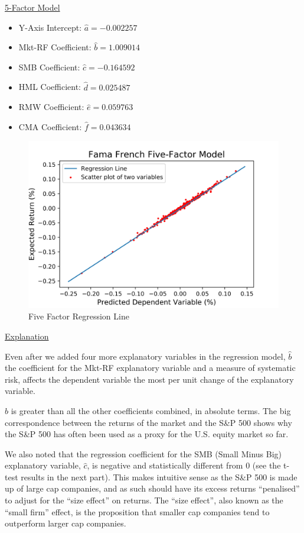\documentclass[a4paper]{article}
\begin{document}
\underline{5-Factor Model}
\begin{itemize}[nosep]
	\item Y-Axis Intercept: $\hat{a} = -0.002257$
	\item Mkt-RF Coefficient: $\hat{b} = 1.009014$
	\item SMB Coefficient: $\hat{c} = -0.164592$
	\item HML Coefficient: $\hat{d} = 0.025487$
	\item RMW Coefficient: $\hat{e} = 0.059763$
	\item CMA Coefficient: $\hat{f} = 0.043634$
\end{itemize}

\newpage
\begin{figure}[ht]
	\centering
	\includegraphics[width= \linewidth]{FF_regression.jpeg}
	\captionsetup{font=small}
	\caption{Five Factor Regression Line}
\end{figure}

\underline{Explanation}

Even after we added four more explanatory variables in the regression model, $\hat{b}$ the coefficient for the Mkt-RF explanatory variable and a measure of systematic risk, affects the dependent variable the most per unit change of the explanatory variable. 

$\hat{b}$ is greater than all the other coefficients combined, in absolute terms. The big correspondence between the returns of the market and the S\&P 500 shows why the S\&P 500 has often been used as a proxy for the U.S. equity market so far.

We also noted that the regression coefficient for the SMB (Small Minus Big) explanatory variable, $\hat{c}$, is negative and statistically different from 0 (see the t-test results in the next part). This makes intuitive sense as the S\&P 500 is made up of large cap companies, and as such should have its excess returns “penalised” to adjust for the “size effect” on returns. The “size effect”, also known as the “small firm” effect, is the proposition that smaller cap companies tend to outperform larger cap companies.
\end{document}

